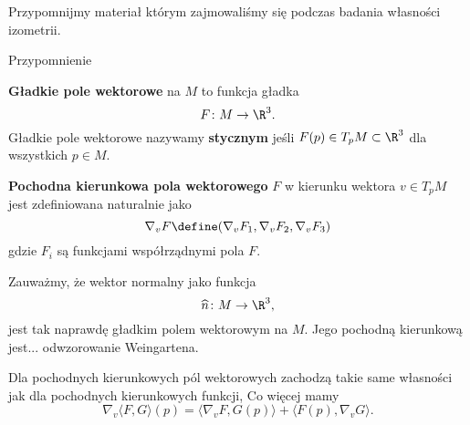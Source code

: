 Przypomnijmy materiał którym zajmowaliśmy się podczas badania własności izometrii.
\begin{frame}[<+->]{Przypomnienie}

\begin{definicja}
\textbf{Gładkie pole wektorowe} na $M$ to funkcja gładka \[F\colon M\to \R^3.\]
Gładkie pole wektorowe nazywamy \textbf{stycznym} jeśli $F(p)\in T_pM\subset \R^3$ dla wszystkich $p\in M$.
\end{definicja}
\begin{definicja}
\textbf{Pochodna kierunkowa pola wektorowego} $F$ w kierunku wektora $v\in T_p M$ jest zdefiniowana naturalnie jako
\[\nabla_v F\define(\nabla_v F_1,\nabla_vF_2,\nabla_vF_3)\] gdzie $F_i$ są funkcjami współrządnymi pola $F$.
\end{definicja}

\end{frame}
\begin{frame}

\begin{przyklad}
Zauważmy, że wektor normalny jako funkcja
\[\widehat{n}\colon M\to\R^3,\]
jest tak naprawdę gładkim polem wektorowym na $M$. Jego pochodną kierunkową jest... odwzorowanie Weingartena.
\end{przyklad}


\pause \begin{lemat}
Dla pochodnych kierunkowych pól wektorowych zachodzą takie same własności jak dla pochodnych kierunkowych funkcji, 
 \pause Co więcej mamy 
\[\nabla_v\langle F,G\rangle(p)=\langle\nabla_vF,G(p)\rangle+\langle F(p),\nabla_vG\rangle.\]
\end{lemat}
 
\end{frame}
